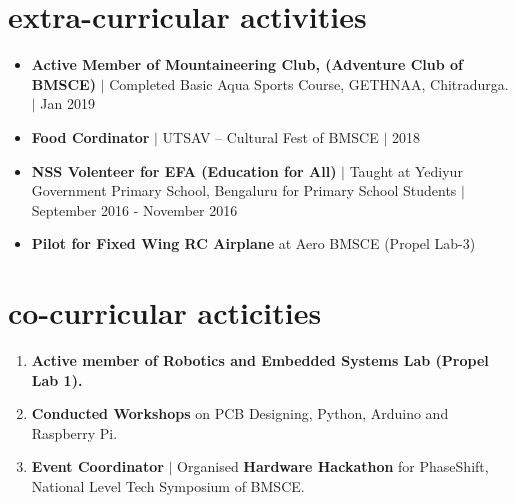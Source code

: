 \documentclass[margin,line]{res}
\begin{document}
\begin{resume}
		\section{\sc extra-curricular activities}

			\begin{itemize}
				\item \textbf{Active Member of Mountaineering Club, (Adventure Club of BMSCE)} $\vert$ Completed Basic Aqua Sports Course, GETHNAA, Chitradurga. $\vert$ Jan 2019
				\item \textbf{Food Cordinator} $\vert$ UTSAV -- Cultural Fest of BMSCE $\vert$ 2018
				\item \textbf{NSS Volenteer for EFA (Education for All)} $\vert$ Taught at Yediyur Government Primary School, Bengaluru for Primary School Students $\vert$ September 2016 - November 2016
					\item \textbf{Pilot for Fixed Wing RC Airplane} at Aero BMSCE (Propel Lab-3)
			\end{itemize} 

		\section{\sc co-curricular acticities}

			\begin{enumerate}
				\item \textbf{Active member of Robotics and Embedded Systems Lab (Propel Lab 1).}
				\item \textbf{Conducted Workshops} on PCB Designing, Python, Arduino and Raspberry Pi.
				\item \textbf{Event Coordinator} $\vert$ Organised \textbf{Hardware Hackathon} for PhaseShift, National Level Tech Symposium of BMSCE.
			\end{enumerate}



\end{resume}
\end{document}
